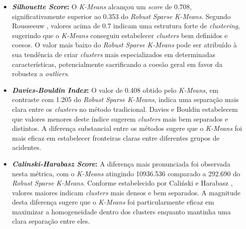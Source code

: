 \documentclass[conference]{IEEEtran}
\begin{document}
\begin{itemize}
    \item \textbf{\textit{Silhouette Score}:} O \textit{K-Means} alcançou um \textit{score} de 0.708, significativamente superior ao 0.353 do \textit{Robust Sparse K-Means}. Segundo Rousseeuw \cite{rousseeuw1987silhouettes}, valores acima de 0.7 indicam uma estrutura forte de \textit{clustering}, sugerindo que o \textit{K-Means} conseguiu estabelecer \textit{clusters} bem definidos e coesos. O valor mais baixo do \textit{Robust Sparse K-Means} pode ser atribuído à sua tendência de criar \textit{clusters} mais especializados em determinadas características, potencialmente sacrificando a coesão geral em favor da robustez a \textit{outliers}.
    
    \item \textbf{\textit{Davies-Bouldin Index}:} O valor de 0.408 obtido pelo \textit{K-Means}, em contraste com 1.205 do \textit{Robust Sparse K-Means}, indica uma separação mais clara entre os \textit{clusters} no método tradicional. Davies e Bouldin \cite{davies1979cluster} estabelecem que valores menores deste índice sugerem \textit{clusters} mais bem separados e distintos. A diferença substancial entre os métodos sugere que o \textit{K-Means} foi mais eficaz em estabelecer fronteiras claras entre diferentes grupos de acidentes.
    
    \item \textbf{\textit{Calinski-Harabasz Score}:} A diferença mais pronunciada foi observada nesta métrica, com o \textit{K-Means} atingindo 10936.536 comparado a 292.690 do \textit{Robust Sparse K-Means}. Conforme estabelecido por Caliński e Harabasz \cite{calinski1974dendrite}, valores maiores indicam \textit{clusters} mais densos e bem separados. A magnitude desta diferença sugere que o \textit{K-Means} foi particularmente eficaz em maximizar a homogeneidade dentro dos clusters enquanto mantinha uma clara separação entre eles.
\end{itemize}
\end{document}
